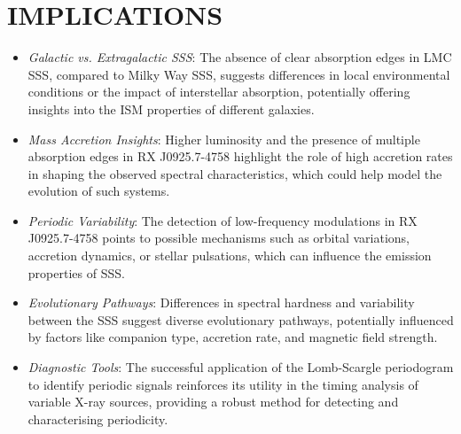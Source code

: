     \section{\MakeUppercase{Implications}}
    	\begin{itemize}
    		\item \textit{Galactic vs. Extragalactic SSS}: The absence of clear absorption edges in LMC SSS, compared to Milky Way SSS, suggests differences in local environmental conditions or the impact of interstellar absorption, potentially offering insights into the ISM properties of different galaxies.
    		
    		\item \textit{Mass Accretion Insights}: Higher luminosity and the presence of multiple absorption edges in RX J0925.7-4758 highlight the role of high accretion rates in shaping the observed spectral characteristics, which could help model the evolution of such systems.
    		
    		\item \textit{Periodic Variability}: The detection of low-frequency modulations in RX J0925.7-4758 points to possible mechanisms such as orbital variations, accretion dynamics, or stellar pulsations, which can influence the emission properties of SSS.
    		
    		\item \textit{Evolutionary Pathways}: Differences in spectral hardness and variability between the SSS suggest diverse evolutionary pathways, potentially influenced by factors like companion type, accretion rate, and magnetic field strength.
    		
    		\item \textit{Diagnostic Tools}: The successful application of the Lomb-Scargle periodogram to identify periodic signals reinforces its utility in the timing analysis of variable X-ray sources, providing a robust method for detecting and characterising periodicity.
    	\end{itemize}
    
